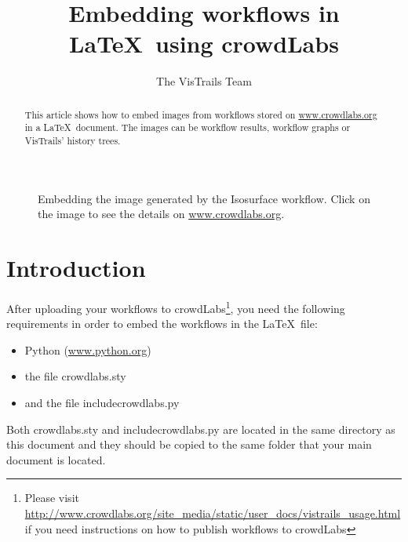 \documentclass{article}
\title{Embedding workflows in \LaTeX\ using crowdLabs}
\author{The VisTrails Team}
\begin{document}
\maketitle
\begin{abstract}
This article shows how to embed images from workflows stored on
\url{www.crowdlabs.org} in a \LaTeX\ document. The images can be
workflow results, workflow graphs or VisTrails' history trees.
\end{abstract}

\begin{figure}[th]
\begin{center}
\end{center}
\vspace{-.5cm}
\caption{Embedding the image generated by the Isosurface workflow. Click on the image to see the details on \url{www.crowdlabs.org}.}
\label{fig:isosurface}
\end{figure}

\section{Introduction}

After uploading your workflows to crowdLabs\footnote{Please visit
\url{http://www.crowdlabs.org/site_media/static/user_docs/vistrails_usage.html}
if you need instructions on how to publish workflows to crowdLabs}, you need the following requirements in order to embed the workflows in the \LaTeX\ file:
\begin{itemize}
\item Python (\url{www.python.org})
\item the file \textsf{crowdlabs.sty}
\item and the file \textsf{includecrowdlabs.py} 
\end{itemize} 

Both \textsf{crowdlabs.sty} and \textsf{includecrowdlabs.py} are
located in the same directory as this document and they should be
copied to the same folder that your main document is located.
\end{document}
